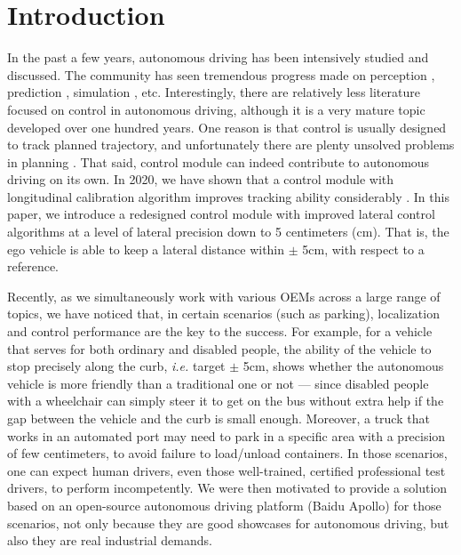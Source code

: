 \documentclass[letterpaper, 10 pt, conference]{ieeeconf}
\begin{document}
\section{Introduction}
In the past a few years, autonomous driving has been intensively studied and discussed. 
The community has seen tremendous progress made on perception \cite{Chen2015DeepDriving, Casser2019Unsupervised, Gordon2019Depth, Sun2019Scalability, 2020PointContrast}, prediction \cite{Alahi2016Social, Vemula2018Social, Deo2018How, Pan2019Lane, Xu2020Data}, simulation \cite{Benekohal1988CARSIM, Dong2011Driver, Geoffrey2011Driving, CARLA2017}, etc. 
Interestingly, there are relatively less literature focused on control in autonomous driving, although it is a very mature topic developed over one hundred years. One reason is that control is usually designed to track planned trajectory, and unfortunately there are plenty unsolved problems in planning \cite{RN290}. That said, control module can indeed contribute to autonomous driving on its own. In 2020, we have shown that a control module with longitudinal calibration algorithm improves tracking ability considerably \cite{9304778}. In this paper, we introduce a redesigned control module with improved lateral control algorithms at a level of lateral precision down to 5 centimeters (cm). That is, the ego vehicle is able to keep a lateral distance within $\pm$ 5cm, with respect to a reference.

Recently, as we simultaneously work with various OEMs across a large range of topics, we have noticed that, in certain scenarios (such as parking), localization and control performance are the key to the success. 
For example, for a vehicle that serves for both ordinary and disabled people, the ability of the vehicle to stop precisely along the curb, \textit{i.e.} target $\pm$ 5cm, shows whether the autonomous vehicle is more friendly than a traditional one or not --- since disabled people with a wheelchair can simply steer it to get on the bus without extra help if the gap between the vehicle and the curb is small enough. 
Moreover, a truck that works in an automated port may need to park in a specific area with a precision of few centimeters, to avoid failure to load/unload containers. 
In those scenarios, one can expect human drivers, even those well-trained, certified professional test drivers, to perform incompetently. 
We were then motivated to provide a solution based on an open-source autonomous driving platform (Baidu Apollo) for those scenarios, not only because they are good showcases for autonomous driving, but also they are real industrial demands.
\end{document}
